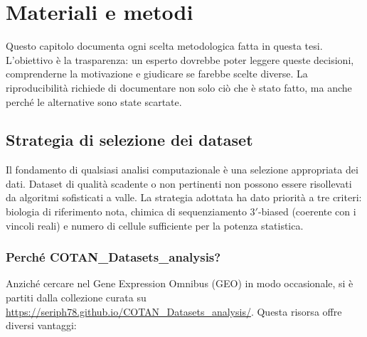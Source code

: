 \chapter{Materiali e metodi}

Questo capitolo documenta ogni scelta metodologica fatta in questa tesi. L'obiettivo è la trasparenza: un esperto dovrebbe poter leggere queste decisioni, comprenderne la motivazione e giudicare se farebbe scelte diverse. La riproducibilità richiede di documentare non solo ciò che è stato fatto, ma anche perché le alternative sono state scartate.

\section{Strategia di selezione dei dataset}

Il fondamento di qualsiasi analisi computazionale è una selezione appropriata dei dati. Dataset di qualità scadente o non pertinenti non possono essere risollevati da algoritmi sofisticati a valle. La strategia adottata ha dato priorità a tre criteri: biologia di riferimento nota, chimica di sequenziamento $3'$-biased (coerente con i vincoli reali) e numero di cellule sufficiente per la potenza statistica.

\subsection*{Perché COTAN\_Datasets\_analysis?}

Anziché cercare nel Gene Expression Omnibus (GEO) in modo occasionale, si è partiti dalla collezione curata su \url{https://seriph78.github.io/COTAN_Datasets_analysis/}. Questa risorsa offre diversi vantaggi:

